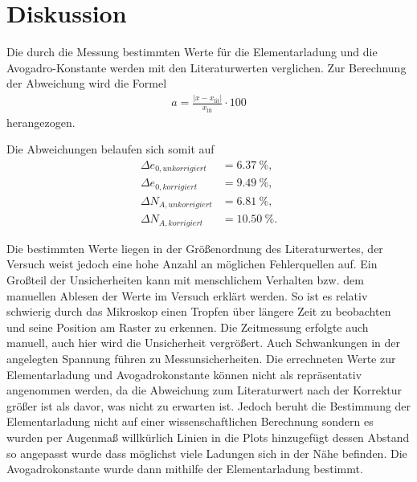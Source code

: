 \section{Diskussion}
\label{sec:Diskussion}
Die durch die Messung bestimmten Werte für die Elementarladung und die Avogadro-Konstante werden mit den Literaturwerten \cite{NIST}
verglichen. 
Zur Berechnung der Abweichung wird die Formel 
\begin{align*}
    a=\frac{|x-x_{\text{lit}}|}{x_{\text{lit}}}\cdot 100 \label{eqn:abweich}
\end{align*}
herangezogen.

Die Abweichungen belaufen sich somit auf
\begin{align*}
    \Delta e_{0,unkorrigiert}&= \qty{6.37}{\percent},\\
    \Delta e_{0,korrigiert}&= \qty{9.49}{\percent},\\
    \Delta N_{A,unkorrigiert}&= \qty{6.81}{\percent},\\  
    \Delta N_{A,korrigiert}&= \qty{10.50}{\percent}.      
\end{align*}

Die bestimmten Werte liegen in der Größenordnung des Literaturwertes, der Versuch weist jedoch eine hohe Anzahl an möglichen Fehlerquellen auf.
Ein Großteil der Unsicherheiten kann mit menschlichem Verhalten bzw.
dem manuellen Ablesen der Werte im Versuch erklärt werden.
So ist es relativ schwierig durch das Mikroskop einen Tropfen über längere Zeit zu beobachten und seine Position am Raster zu erkennen.
Die Zeitmessung erfolgte auch manuell, auch hier wird die Unsicherheit vergrößert.
Auch Schwankungen in der angelegten Spannung führen zu Messunsicherheiten.
Die errechneten Werte zur Elementarladung und Avogadrokonstante können nicht als repräsentativ angenommen werden, da die Abweichung zum Literaturwert
nach der Korrektur größer ist als davor, was nicht zu erwarten ist.
Jedoch beruht die Bestimmung der Elementarladung nicht auf einer wissenschaftlichen Berechnung sondern es wurden per Augenmaß willkürlich Linien
in die Plots hinzugefügt dessen Abstand so angepasst wurde dass möglichst viele Ladungen sich in der Nähe befinden.
Die Avogadrokonstante wurde dann mithilfe der Elementarladung bestimmt.
